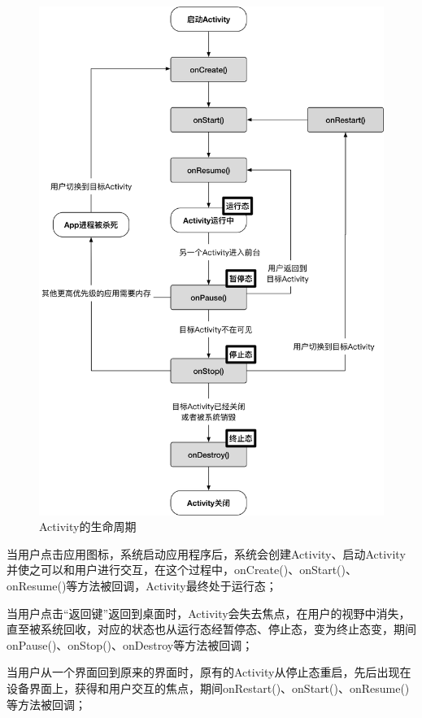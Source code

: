 \begin{figure}
	\centering
	\includegraphics[width=\textwidth]{./Figures/Activity-lifecycle.png}
	\caption{Activity的生命周期}
	\label{fig:Activity-lifecycle}
\end{figure}


当用户点击应用图标，系统启动应用程序后，系统会创建Activity、启动Activity并使之可以和用户进行交互，在这个过程中，onCreate()、onStart()、onResume()等方法被回调，Activity最终处于运行态；

当用户点击“返回键”返回到桌面时，Activity会失去焦点，在用户的视野中消失，直至被系统回收，对应的状态也从运行态经暂停态、停止态，变为终止态变，期间onPause()、onStop()、onDestroy等方法被回调；

当用户从一个界面回到原来的界面时，原有的Activity从停止态重启，先后出现在设备界面上，获得和用户交互的焦点，期间onRestart()、onStart()、onResume()等方法被回调；

